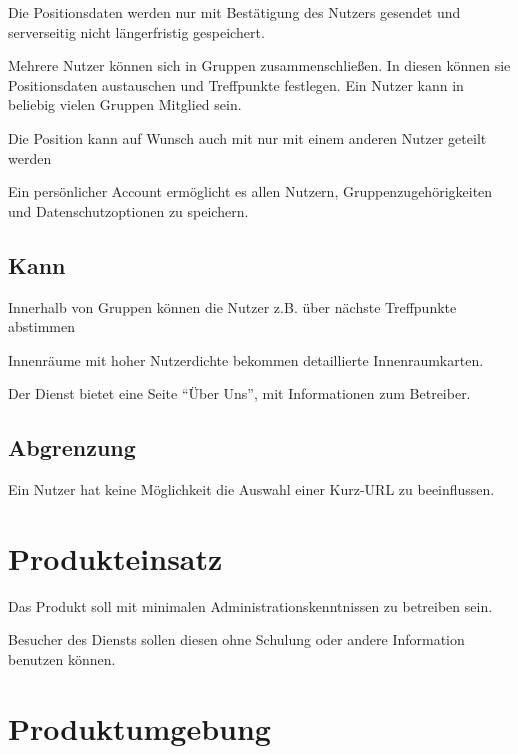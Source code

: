 \documentclass[parskip=full,11pt,twoside]{scrartcl}
\begin{document}
Die Positionsdaten werden nur mit Bestätigung
des Nutzers gesendet und serverseitig nicht längerfristig gespeichert.

Mehrere Nutzer können sich in Gruppen zusammenschließen. In diesen
können sie Positionsdaten austauschen und Treffpunkte festlegen.
Ein Nutzer kann in beliebig vielen Gruppen Mitglied sein.

Die Position kann auf Wunsch auch mit nur mit einem anderen Nutzer geteilt werden

Ein persönlicher Account ermöglicht es allen Nutzern,
Gruppenzugehörigkeiten und Datenschutzoptionen zu speichern.

\subsection{Kann}

Innerhalb von Gruppen können die Nutzer z.B. über nächste Treffpunkte abstimmen

Innenräume mit hoher Nutzerdichte bekommen detaillierte Innenraumkarten.

Der Dienst bietet eine Seite \enquote{Über Uns},
mit Informationen zum Betreiber.

\subsection{Abgrenzung}

Ein Nutzer hat keine Möglichkeit die Auswahl einer Kurz-URL zu beeinflussen.

\pagebreak
\section{Produkteinsatz}

Das Produkt soll mit minimalen Administrationskenntnissen zu betreiben sein.

Besucher des Diensts sollen diesen ohne Schulung oder andere Information benutzen können.

\section{Produktumgebung}
\end{document}
